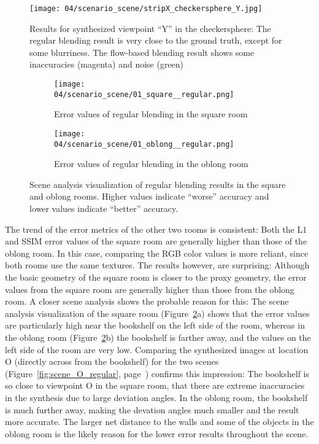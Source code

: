 \begin{figure}
		\centering
    \texttt{[image: 04/scenario\_scene/stripX\_checkersphere\_Y.jpg]}
		\caption[Viewpoint ``Y'' in the checkersphere]{Results for synthesized viewpoint ``Y'' in the checkersphere: The regular blending result is very close to the ground truth, except for some blurriness. The flow-based blending result shows some inaccuracies (magenta) and noise (green)}
		\label{fig:scene_checkersphere_Y}
\end{figure}

\begin{figure}
\centering
    \hfill
    \begin{subfigure}[b]{0.4\textwidth}
            \centering
            \texttt{[image: 04/scenario\_scene/01\_square\_\_regular.png]}
            \caption{Error values of regular blending in the square room}
    \end{subfigure}
    \hfill
    \begin{subfigure}[b]{0.4\textwidth}
            \centering
            \texttt{[image: 04/scenario\_scene/01\_oblong\_\_regular.png]}
            \caption{Error values of regular blending in the oblong room}
    \end{subfigure}
    \hfill
  \caption[Scene analysis visualization of regular blending results in the square and oblong rooms]{Scene analysis visualization of regular blending results in the square and oblong rooms. Higher values indicate ``worse'' accuracy and lower values indicate ``better'' accuracy.} \label{fig:scene_regular_square_oblong}
\end{figure}

The trend of the error metrics of the other two rooms is consistent: Both the L1 and SSIM error values of the square room are generally higher than those of the oblong room. In this case, comparing the RGB color values is more reliant, since both rooms use the same textures. The results however, are surprising: Although the basic geometry of the square room is closer to the proxy geometry, the error values from the square room are generally higher than those from the oblong room.
A closer scene analysis shows the probable reason for this: The scene analysis visualization of the square room (Figure~\ref{fig:scene_regular_square_oblong}a) shows that the error values are particularly high near the bookshelf on the left side of the room, whereas in the oblong room (Figure~\ref{fig:scene_regular_square_oblong}b) the bookshelf is farther away, and the values on the left side of the room are very low.
Comparing the synthesized images at location O (directly across from the bookshelf) for the two scenes (Figure~\ref{fig:scene_O_regular}, page~\pageref{fig:scene_O_regular}) confirms this impression: The bookshelf is so close to viewpoint O in the square room, that there are extreme inaccuracies in the synthesis due to large deviation angles. In the oblong room, the bookshelf is much further away, making the devation angles much smaller and the result more accurate. The larger net distance to the walls and some of the objects in the oblong room is the likely reason for the lower error results throughout the scene.

